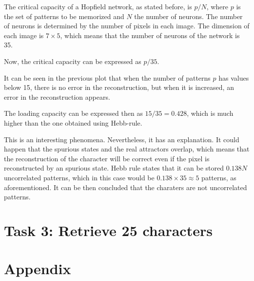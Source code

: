 \documentclass[10pt]{article}
\begin{document}
\begin{multicols}{2}
  The critical capacity of a Hopfield network, as stated before, is $p/N$,
  where $p$ is the set of patterns to be memorized and $N$ the number
  of neurons. The number of neurons is determined by the number of pixels
  in each image. The dimension of each image is $7 \times 5$, which means that
  the number of neurons of the network is 35.

  Now, the critical capacity can be expressed as $p/35$.

  It can be seen in the previous plot that when the number of patterns
  $p$ has values below 15, there is no error in the reconstruction,
  but when it is increased, an error in the reconstruction appears.

  The loading capacity can be expressed then as $15/35 = 0.428$, which is
  much higher than the one obtained using Hebb-rule.

  This is an interesting phenomena. Nevertheless, it has an explanation. It
  could happen that the spurious states and the real attractors overlap, which
  means that the reconstruction of the character will be correct even if the
  pixel is reconstructed by an spurious state. Hebb rule states that it can be
  stored $0.138N$ uncorrelated patterns, which in this case would be
  $0.138 \times 35 \approx 5$ patterns, as aforementioned. It can be then concluded that
  the charaters are not uncorrelated patterns.    
  
  \section*{Task 3: Retrieve 25 characters}
  

\end{multicols}
\newpage

  \section*{Appendix}
\end{document}
